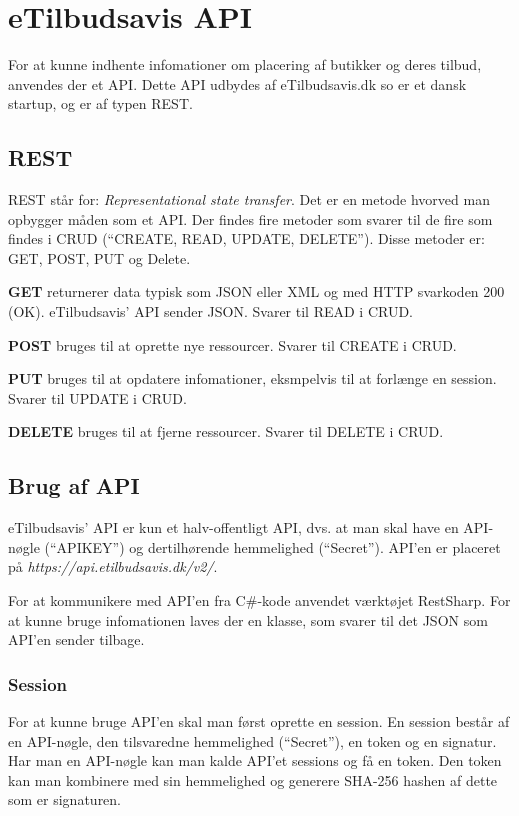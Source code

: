\chapter{eTilbudsavis API}
For at kunne indhente infomationer om placering af butikker og deres tilbud, anvendes der et API.
Dette API udbydes af eTilbudsavis.dk so er et dansk startup, og er af typen REST.

\section{REST}
REST står for: \textit{Representational state transfer}.
Det er en metode hvorved man opbygger måden som et API. 
Der findes fire metoder som svarer til de fire som findes i CRUD (``CREATE, READ, UPDATE, DELETE'').
Disse metoder er: GET, POST, PUT og Delete.

\textbf{GET}
returnerer data typisk som JSON eller XML og med HTTP svarkoden 200 (OK). 
eTilbudsavis' API sender JSON. 
Svarer til READ i CRUD.

\textbf{POST}
bruges til at oprette nye ressourcer.
Svarer til CREATE i CRUD.

\textbf{PUT}
bruges til at opdatere infomationer, eksmpelvis til at forlænge en session.
Svarer til UPDATE i CRUD.

\textbf{DELETE}
bruges til at fjerne ressourcer. 
Svarer til DELETE i CRUD.

\section{Brug af API}
eTilbudsavis' API er kun et halv-offentligt API, dvs. at man skal have en API-nøgle (``APIKEY'') og dertilhørende hemmelighed (``Secret'').
API'en er placeret på \textit{https://api.etilbudsavis.dk/v2/}. \citep{eTilAPI}

For at kommunikere med API'en fra C\#-kode anvendet værktøjet RestSharp. \citep{RestSharp} 
For at kunne bruge infomationen laves der en klasse, som svarer til det JSON som API'en sender tilbage.

\subsection{Session}
For at kunne bruge API'en skal man først oprette en session. 
En session består af en API-nøgle, den tilsvaredne hemmelighed (``Secret''), en token og en signatur.
Har man en API-nøgle kan man kalde API'et sessions og få en token.
Den token kan man kombinere med sin hemmelighed og generere SHA-256 hashen af dette som er signaturen. 

